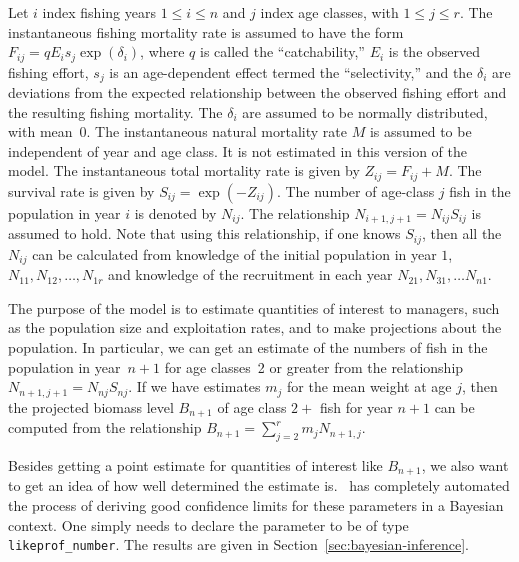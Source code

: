 \documentclass{admbmanual}
\begin{document}
Let $i$ index fishing years $1\le i\le n$ and $j$ index age classes, with $1\le
j\le r$. The instantaneous fishing mortality rate is assumed to have the form
$F_{ij}=qE_is_j\exp(\delta_i)$, where $q$ is called the ``catchability,'' $E_i$
is the observed fishing effort, $s_j$ is an age-dependent effect termed the
``selectivity,'' and the $\delta_i$ are deviations from the expected
relationship between the observed fishing effort and the resulting fishing
mortality. The $\delta_i$ are assumed to be normally distributed, with mean~0.
The instantaneous natural mortality rate $M$ is assumed to be independent of
year and age class. It is not estimated in this version of the model. The
instantaneous total mortality rate is given by $Z_{ij}=F_{ij}+M$. The survival
rate is given by $S_{ij}=\exp(-Z_{ij})$. The number of age-class $j$ fish in the
population in year $i$ is denoted by $N_{ij}$. The relationship
$N_{i+1,j+1}=N_{ij}S_{ij}$ is assumed to hold. Note that using this
relationship, if one knows $S_{ij}$, then all the $N_{ij}$ can be calculated
from knowledge of the initial population in year $1$, $N_{11}, N_{12},\ldots,
N_{1r}$ and knowledge of the recruitment in each year $N_{21}, N_{31},\ldots
N_{n1}$.

The purpose of the model is to estimate quantities of interest to managers, such
as the population size and exploitation rates, and to make projections about the
population. In particular, we can get an estimate of the numbers of fish in the
population in year~$n+1$ for age classes~2 or greater from the relationship
$N_{n+1,j+1}=N_{nj}S_{nj}$. If we have estimates $m_j$ for the mean weight at
age $j$, then the projected biomass level $B_{n+1}$ of age class $2+$ fish for
year $n+1$ can be computed from the relationship $B_{n+1}=\sum_{j=2}^r
m_jN_{n+1,j}$.

Besides getting a point estimate for quantities of interest like $B_{n+1}$, we
also want to get an idea of how well determined the estimate is. \ADM\ has
completely automated the process of deriving good confidence limits for these
parameters in a Bayesian context. One simply needs to declare the parameter to
be of type \texttt{likeprof\_number}. The results are given in
Section~\ref{sec:bayesian-inference}.
\end{document}
